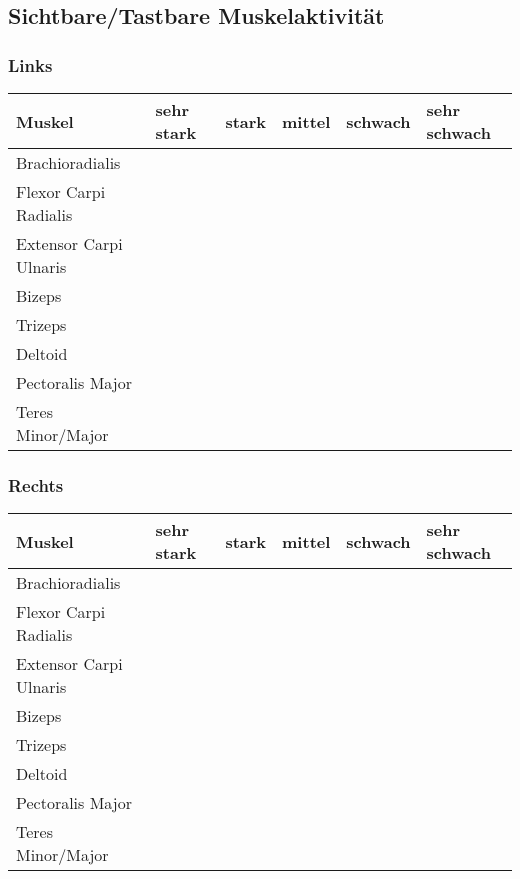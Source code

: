 \documentclass{article}
\begin{document}
\subsection{Sichtbare/Tastbare Muskelaktivit\"at}
\subsubsection{Links}
\begin{center}
  \begin{tabular}{ |p{} |  p{} | p{} | p{} | p{} | p{} |  }
    \hline
    Muskel & sehr stark & stark & mittel & schwach & sehr schwach \\ \hline
    Brachioradialis  & & & & &\\ \hline
    Flexor Carpi Radialis  & & & & &\\ \hline
    Extensor Carpi Ulnaris  & & & & &\\ \hline
    Bizeps & & & & &\\ \hline
    Trizeps & & & & &\\ \hline
    Deltoid & & & & &\\ \hline
    Pectoralis Major & & & & &\\ \hline
    Teres Minor/Major & & & & &\\ \hline 
  \end{tabular}
\end{center}

\subsubsection{Rechts}
\begin{center}
  \begin{tabular}{ |p{} |  p{} | p{} | p{} | p{} | p{} |  }
    \hline
    Muskel & sehr stark & stark & mittel & schwach & sehr schwach \\ \hline
    Brachioradialis  & & & & &\\ \hline
    Flexor Carpi Radialis  & & & & &\\ \hline
    Extensor Carpi Ulnaris  & & & & &\\ \hline
    Bizeps & & & & &\\ \hline
    Trizeps & & & & &\\ \hline
    Deltoid & & & & &\\ \hline
    Pectoralis Major & & & & &\\ \hline
    Teres Minor/Major & & & & &\\ \hline 
  \end{tabular}
\end{center}
\end{document}
